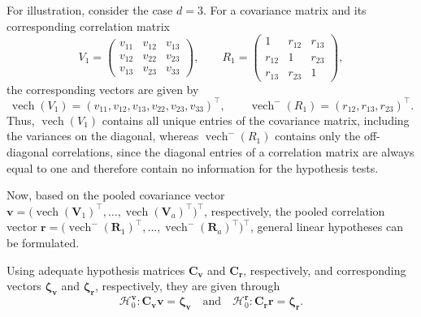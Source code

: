 For illustration, consider the case \(d=3\). For a covariance matrix and its corresponding correlation matrix
\begin{equation}
V_1 =
\begin{pmatrix}
v_{11} & v_{12} & v_{13}\\
v_{12} & v_{22} & v_{23}\\
v_{13} & v_{23} & v_{33}
\end{pmatrix},
\qquad
R_1 =
\begin{pmatrix}
1 & r_{12} & r_{13}\\
r_{12} & 1 & r_{23}\\
r_{13} & r_{23} & 1
\end{pmatrix},
\label{eq:matrix-example}
\end{equation}
the corresponding vectors are given by
\begin{equation}
\operatorname{vech}(V_1)
=
(v_{11}, v_{12}, v_{13}, v_{22}, v_{23}, v_{33})^\top,
\qquad
\operatorname{vech}^{-}(R_1)
=
(r_{12}, r_{13}, r_{23})^\top .
\label{eq:vech-example}
\end{equation}
Thus, \(\operatorname{vech}(V_1)\) contains all unique entries of the covariance matrix, including the variances on the diagonal, whereas \(\operatorname{vech}^{-}(R_1)\) contains only the off-diagonal correlations, since the diagonal entries of a correlation matrix are always equal to one and therefore contain no information for the hypothesis tests.

Now, based on the pooled covariance vector
\(\boldsymbol{v}=\bigl(\operatorname{vech}(\boldsymbol{V}_1)^\top, \dots, \operatorname{vech}(\boldsymbol{V}_a)^\top\bigr)^\top\),
respectively, the pooled correlation vector
\(\boldsymbol{r}=\bigl(\operatorname{vech}^{-}(\boldsymbol{R}_1)^\top, \dots, \operatorname{vech}^{-}(\boldsymbol{R}_a)^\top\bigr)^\top\),
general linear hypotheses can be formulated.

Using adequate hypothesis matrices \(\boldsymbol{C}_{\boldsymbol{v}}\) and
\(\boldsymbol{C}_{\boldsymbol{r}}\), respectively, and corresponding vectors
\(\boldsymbol{\zeta}_{\boldsymbol{v}}\) and \(\boldsymbol{\zeta}_{\boldsymbol{r}}\), respectively,
they are given through
\begin{equation}
\mathcal{H}_0^{\boldsymbol{v}} :
\boldsymbol{C}_{\boldsymbol{v}} \boldsymbol{v} = \boldsymbol{\zeta}_{\boldsymbol{v}}
\quad \text{and} \quad
\mathcal{H}_0^{\boldsymbol{r}} :
\boldsymbol{C}_{\boldsymbol{r}} \boldsymbol{r} = \boldsymbol{\zeta}_{\boldsymbol{r}} .
\label{eq:Hypothesen}
\end{equation}


